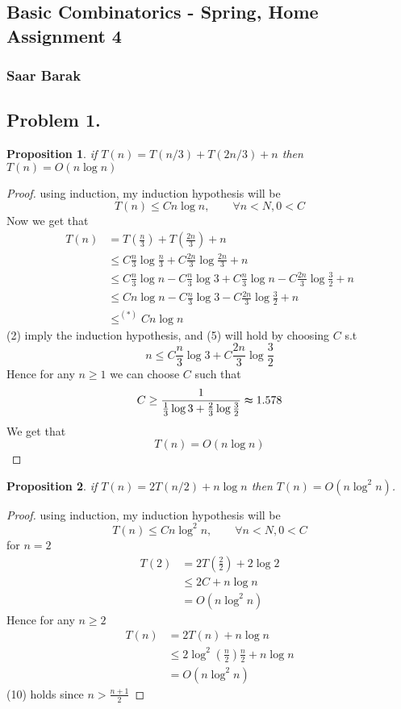 \documentclass[12pt]{article}
\newtheorem{prop}{Proposition}
\begin{document}
\begin{center}
\section*{Basic Combinatorics - Spring, Home Assignment 4}
\subsubsection*{Saar Barak}
\end{center}
\subsection*{Problem 1.}
\begin{prop}if $T(n) = T(n/3) + T(2n/3) + n$ then $T(n) = O(n \log n)$  \end{prop}
\begin{proof}
using induction, my induction hypothesis will  be
$$T(n) \leq C n \log n, \qquad \forall n < N,0<C  $$
Now we get that 
\begin{align}
T(n) &= T\left(\frac{n}{3}\right)+T\left(\frac{2n}{3}\right)+n \\
&\leq  C \frac{n}{3}\log \frac{n}{3} + C\frac{2n}{3}\log \frac{2n}{3} + n\\
&\leq C\frac{n}{3} \log n- C\frac{n}{3}\log 3 +C\frac{n}{3} \log n-  C\frac{2n}{3}\log \frac{3}{2} + n \\
&\leq Cn \log n- C\frac{n}{3}\log 3-  C\frac{2n}{3}\log \frac{3}{2} + n\\
&\leq^{(*)} Cn\log n
\end{align}
(2) imply the induction hypothesis, and (5) will hold by choosing $C$ s.t
\[ n \leq C\frac{n}{3}\log 3 +  C\frac{2n}{3}\log \frac{3}{2} 
\]
Hence for any  $n\geq 1$ we can choose $C$ such that
\[C \geq \frac{1}{\frac{1}{3}\log 3+\frac{2}{3}\log \frac{3}{2}} \thickapprox 1.578
\] We get that \[T(n) = O(n \log n)\]
\end{proof}
\pagebreak
\begin{prop}if $T(n) = 2T(n/2) + n \log n $ then $T(n) = O(n \log^2 n)$.\end{prop}
\begin{proof}
using induction, my induction hypothesis will  be
$$T(n) \le C n \log^2 n, \qquad \forall n < N,0<C$$
for $n=2$
\begin{align}
T(2) &= 2T\left(\frac{2}{2}\right)+2\log 2\\
&\le 2C+n\log n\\
&= O( n \log^2 n)
\end{align}
Hence for any  $n\geq 2$
\begin{align}
T(n) &= 2T(n)+n \log n\\
 &\le 2\log^2(\frac{n}{2})\frac{n}{2}+n \log n\\
 &= O(n \log^2 n)
\end{align}
(10) holds since $n>\frac{n+1}{2}$
\end{proof}
\end{document}
